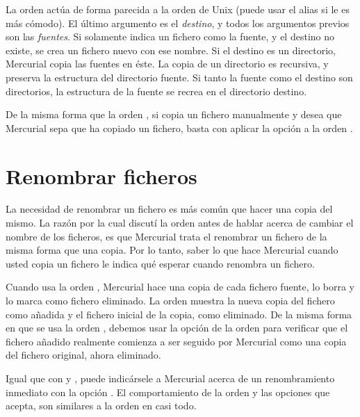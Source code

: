 La orden  actúa de forma parecida a la orden 
de Unix (puede usar el alias  si le es más cómodo).  El
último argumento es el \emph{destino}, y todos los argumentos previos
son las \emph{fuentes}.  Si solamente indica un fichero como la
fuente, y el destino no existe, se crea un fichero nuevo con ese nombre.
Si el destino es un directorio, Mercurial copia las fuentes en éste.
La copia de un directorio es recursiva, y preserva la estructura del
directorio fuente.
Si tanto la fuente como el destino son directorios, la estructura de
la fuente se recrea en el directorio destino.

De la misma forma que la orden , si copia un fichero
manualmente y desea que Mercurial sepa que ha copiado un fichero,
basta con aplicar la opción  a la orden 
.

\section{Renombrar ficheros}

La necesidad de renombrar un fichero es más común que hacer una copia
del mismo.  La razón por la cual discutí la orden  antes
de hablar acerca de cambiar el nombre de los ficheros, es que
Mercurial trata el renombrar un fichero de la misma forma que una
copia.  Por lo tanto, saber lo que hace Mercurial cuando usted copia
un fichero le indica qué esperar cuando renombra un fichero.

Cuando usa la orden , Mercurial hace una copia de cada
fichero fuente, lo borra y lo marca como fichero eliminado.
La orden  muestra la nueva copia del fichero como
añadida y el fichero inicial de la copia, como eliminado.
De la misma forma en que se usa la orden , debemos usar la
opción  de la orden  para verificar
que el fichero añadido realmente comienza a  ser seguido por Mercurial
como una copia del fichero original, ahora eliminado.

Igual que con  y , puede indicársele a
Mercurial acerca de un renombramiento inmediato con la opción
.   El comportamiento de la orden
 y las opciones que acepta, son similares a la orden
 en casi todo.

